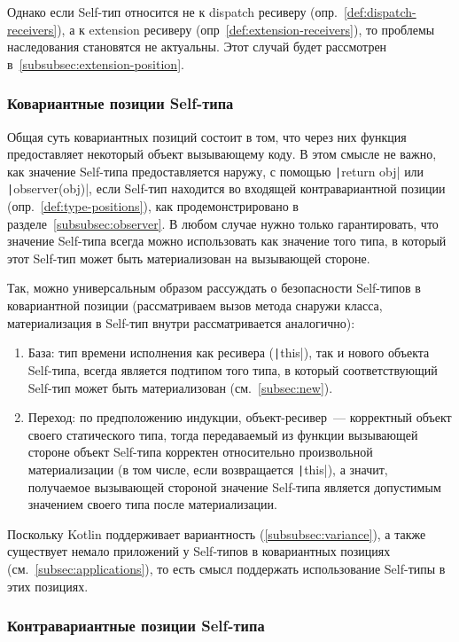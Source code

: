 Однако если Self-тип относится не к dispatch ресиверу (опр.~\ref{def:dispatch-receivers}), а к extension ресиверу (опр~\ref{def:extension-receivers}), то проблемы наследования становятся не актуальны.
Этот случай будет рассмотрен в~\ref{subsubsec:extension-position}.

\subsubsection{Ковариантные позиции Self-типа}

Общая суть ковариантных позиций состоит в том, что через них функция предоставляет некоторый объект вызывающему коду.
В этом смысле не важно, как значение Self-типа предоставляется наружу, с помощью \texttt|return obj| или \texttt|observer(obj)|, если Self-тип находится во входящей контравариантной позиции (опр.~\ref{def:type-positions}), как продемонстрировано в разделе~\ref{subsubsec:observer}.
В любом случае нужно только гарантировать, что значение Self-типа всегда можно использовать как значение того типа, в который этот Self-тип может быть материализован на вызывающей стороне.

Так, можно универсальным образом рассуждать о безопасности Self-типов в ковариантной позиции (рассматриваем вызов метода снаружи класса, материализация в Self-тип внутри рассматривается аналогично):
\begin{enumerate}
    \item База: тип времени исполнения как ресивера (\texttt|this|), так и нового объекта Self-типа, всегда является подтипом того типа, в который соответствующий Self-тип может быть материализован (см.~\ref{subsec:new}).
    \item Переход: по предположению индукции, объект-ресивер~--- корректный объект своего статического типа, тогда передаваемый из функции вызывающей стороне объект Self-типа корректен относительно произвольной материализации (в том числе, если возвращается \texttt|this|), а значит, получаемое вызывающей стороной значение Self-типа является допустимым значением своего типа после материализации.
\end{enumerate}

Поскольку Kotlin поддерживает вариантность (\ref{subsubsec:variance}), а также существует немало приложений у Self-типов в ковариантных позициях (см.~\ref{subsec:applications}), то есть смысл поддержать использование Self-типы в этих позициях.

\subsubsection{Контравариантные позиции Self-типа}

